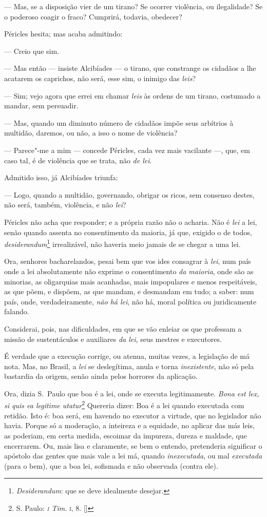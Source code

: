 --- Mas, se a disposição vier de um tirano? Se ocorrer
violência, ou ilegalidade? Se o poderoso coagir o fraco? Cumprirá,
todavia, obedecer? 

Péricles hesita; mas acaba admitindo:

--- Creio que sim.

--- Mas então --- insiste Alcibíades --- o tirano, que constrange 
os cidadãos a lhe acatarem os caprichos, não será, esse sim, 
o inimigo das \textit{leis}?

--- Sim; vejo agora que errei em chamar \textit{leis} às
ordens de um tirano, costumado a mandar, sem persuadir.

--- Mas, quando um diminuto número de cidadãos impõe seus
arbítrios à multidão, daremos, ou não, a isso o nome de violência?

--- Parece"-me a mim --- concede Péricles, cada vez mais
vacilante ---, que, em caso tal, é de violência que se
trata, não \textit{de lei}.

Admitido isso, já Alcibíades triunfa:

--- Logo, quando a multidão, governando, obrigar os ricos,
sem consenso destes, não será, também, violência, e não
\textit{lei}?

Péricles não acha que responder; e a própria
razão não o acharia. Não é \textit{lei} a lei, senão quando assenta no
consentimento da maioria, já que, exigido o de todos,
\textit{desiderandum}\footnote{ \textit{Desiderandum}: que se deve idealmente
desejar.} irrealizável, não haveria meio jamais de se chegar a uma lei.

Ora, senhores bacharelandos, pesai bem que vos ides consagrar à
\textit{lei}, num país onde a lei absolutamente não exprime o
consentimento \textit{da maioria}, onde são as minorias, as oligarquias
mais acanhadas, mais impopulares e menos respeitáveis, as que põem, e
dispõem, as que mandam, e desmandam em tudo; a saber: num país, onde,
verdadeiramente, \textit{não há lei}, não há, moral política ou
juridicamente falando.

Considerai, pois, nas dificuldades, em que se vão enleiar os que
professam a missão de sustentáculos e auxiliares \textit{da lei}, seus
mestres e executores.

É verdade que a execução corrige, ou atenua, muitas vezes, a
legislação de má nota. Mas, no Brasil, a \textit{lei} se deslegítima,
anula e torna \textit{inexistente}, não só pela bastardia da origem,
senão ainda pelos horrores da aplicação.

Ora, dizia S.~Paulo que boa é a lei, onde se executa legitimamente. \textit{Bona est lex,
si quis ea legitime utatur}\footnote{ S. Paulo: \textit{\textsc{i} Tim. }\textsc{i},
8. []} Quereria dizer: Boa é a lei quando executada com retidão.
Isto é: boa será, em havendo no executor a virtude, que no legislador
não havia. Porque só a moderação, a inteireza e a equidade, no aplicar
das más leis, as poderiam, em certa medida, escoimar da impureza,
dureza e maldade, que encerrarem. Ou, mais lisa e claramente, se bem o
entendo, pretenderia significar o apóstolo das gentes que mais vale a
lei má, quando \textit{inexecutada}, ou mal \textit{executada} (para o
bem), que a boa lei, sofismada e não observada (contra ele).

